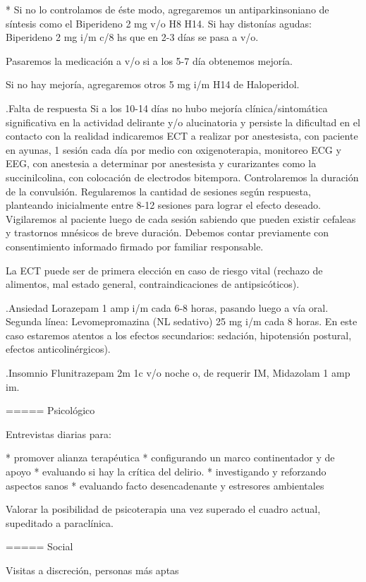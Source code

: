 * Si no lo controlamos de éste modo, agregaremos un antiparkinsoniano de síntesis como el Biperideno 2 mg v/o H8 H14. Si hay distonías agudas: Biperideno 2 mg i/m c/8 hs que en 2-3 días se pasa a v/o.

Pasaremos la medicación a v/o si a los 5-7 día obtenemos mejoría.

Si no hay mejoría, agregaremos otros 5 mg i/m H14 de Haloperidol.

.Falta de respuesta
Si a los 10-14 días no hubo mejoría clínica/sintomática significativa en la actividad delirante y/o alucinatoria y persiste la dificultad en el contacto con la realidad indicaremos ECT a realizar por anestesista, con paciente en ayunas, 1 sesión cada día por medio con oxigenoterapia, monitoreo ECG y EEG, con anestesia a determinar por anestesista y curarizantes como la succinilcolina, con colocación de electrodos bitempora. Controlaremos la duración de la convulsión. Regularemos la cantidad de sesiones según respuesta, planteando inicialmente entre 8-12 sesiones para lograr el efecto deseado. Vigilaremos al paciente luego de cada sesión sabiendo que pueden existir cefaleas y trastornos mnésicos de breve duración. Debemos contar previamente con consentimiento informado firmado por familiar responsable.

La ECT puede ser de primera elección en caso de riesgo vital (rechazo de alimentos, mal estado general, contraindicaciones de antipsicóticos).

.Ansiedad
Lorazepam 1 amp i/m cada 6-8 horas, pasando luego a vía oral. Segunda línea: Levomepromazina (NL sedativo) 25 mg i/m cada 8 horas. En este caso estaremos atentos a los efectos secundarios: sedación, hipotensión postural, efectos anticolinérgicos).

.Insomnio
Flunitrazepam 2m 1c v/o noche o, de requerir IM, Midazolam 1 amp im.


===== Psicológico

Entrevistas diarias para:

* promover alianza terapéutica
* configurando un marco continentador y de apoyo
* evaluando si hay la crítica del delirio.
* investigando y reforzando aspectos sanos
* evaluando facto desencadenante y estresores ambientales

Valorar la posibilidad de psicoterapia una vez superado el cuadro actual, supeditado a paraclínica.

===== Social

Visitas a discreción, personas más aptas

